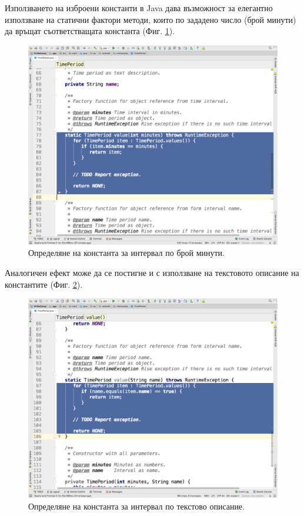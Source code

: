 \documentclass[book,14pt,oneside,openany]{memoir}
\begin{document}
Използването на изброени константи в Java дава възможност за елегантно използване на статични фактори методи, които по зададено число (брой минути) да връщат съответстващата константа (Фиг. \ref{fig:pic0081}).

\begin{figure}[h]
  \centering
  \includegraphics[height=0.45\pdfpageheight]{pic0081}
  \caption{Определяне на константа за интервал по брой минути.}
\label{fig:pic0081}
\end{figure}
\FloatBarrier

Аналогичен ефект може да се постигне и с използване на текстовото описание на константите (Фиг. \ref{fig:pic0082}).

\begin{figure}[h]
  \centering
  \includegraphics[height=0.45\pdfpageheight]{pic0082}
  \caption{Определяне на константа за интервал по текстово описание.}
\label{fig:pic0082}
\end{figure}
\FloatBarrier
\end{document}
